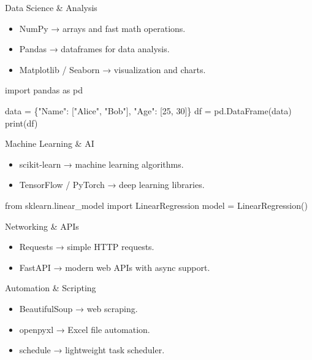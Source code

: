 \documentclass[
  letterpaper,
  DIV=11,
  numbers=noendperiod]{scrreprt}
\newenvironment{Shaded}{\begin{snugshade}}{\end{snugshade}}
\newcommand{\BuiltInTok}[1]{\textcolor[rgb]{0.00,0.23,0.31}{#1}}
\newcommand{\DecValTok}[1]{\textcolor[rgb]{0.68,0.00,0.00}{#1}}
\newcommand{\ImportTok}[1]{\textcolor[rgb]{0.00,0.46,0.62}{#1}}
\newcommand{\NormalTok}[1]{\textcolor[rgb]{0.00,0.23,0.31}{#1}}
\newcommand{\OperatorTok}[1]{\textcolor[rgb]{0.37,0.37,0.37}{#1}}
\newcommand{\StringTok}[1]{\textcolor[rgb]{0.13,0.47,0.30}{#1}}
\providecommand{\tightlist}{%
  \setlength{\itemsep}{0pt}\setlength{\parskip}{0pt}}
\begin{document}
Data Science \& Analysis

\begin{itemize}
\tightlist
\item
  NumPy → arrays and fast math operations.
\item
  Pandas → dataframes for data analysis.
\item
  Matplotlib / Seaborn → visualization and charts.
\end{itemize}

\begin{Shaded}
\begin{Highlighting}[]
\ImportTok{import}\NormalTok{ pandas }\ImportTok{as}\NormalTok{ pd}

\NormalTok{data }\OperatorTok{=}\NormalTok{ \{}\StringTok{"Name"}\NormalTok{: [}\StringTok{"Alice"}\NormalTok{, }\StringTok{"Bob"}\NormalTok{], }\StringTok{"Age"}\NormalTok{: [}\DecValTok{25}\NormalTok{, }\DecValTok{30}\NormalTok{]\}}
\NormalTok{df }\OperatorTok{=}\NormalTok{ pd.DataFrame(data)}
\BuiltInTok{print}\NormalTok{(df)}
\end{Highlighting}
\end{Shaded}

Machine Learning \& AI

\begin{itemize}
\tightlist
\item
  scikit-learn → machine learning algorithms.
\item
  TensorFlow / PyTorch → deep learning libraries.
\end{itemize}

\begin{Shaded}
\begin{Highlighting}[]
\ImportTok{from}\NormalTok{ sklearn.linear\_model }\ImportTok{import}\NormalTok{ LinearRegression}
\NormalTok{model }\OperatorTok{=}\NormalTok{ LinearRegression()}
\end{Highlighting}
\end{Shaded}

Networking \& APIs

\begin{itemize}
\tightlist
\item
  Requests → simple HTTP requests.
\item
  FastAPI → modern web APIs with async support.
\end{itemize}

Automation \& Scripting

\begin{itemize}
\tightlist
\item
  BeautifulSoup → web scraping.
\item
  openpyxl → Excel file automation.
\item
  schedule → lightweight task scheduler.
\end{itemize}
\end{document}
